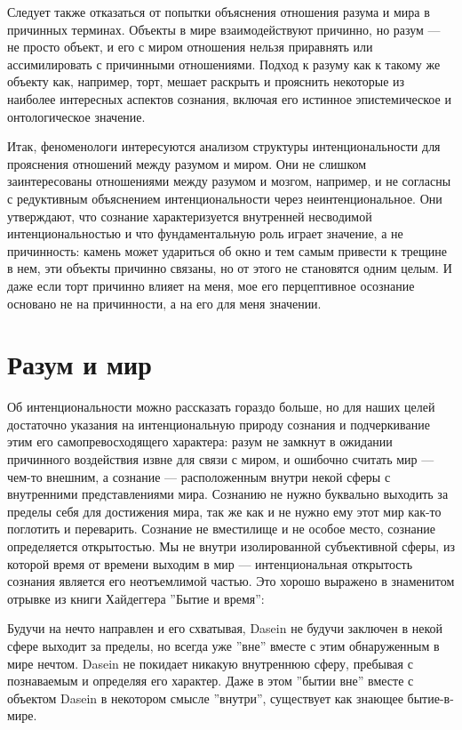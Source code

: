 \documentclass[11pt]{book}
\begin{document}
Следует также отказаться от попытки объяснения отношения разума и мира в причинных терминах. Объекты в мире взаимодействуют причинно, но разум --- не просто объект, и его с миром отношения нельзя приравнять или ассимилировать с причинными отношениями. Подход к разуму как к такому же объекту как, например, торт, мешает раскрыть и прояснить некоторые из наиболее интересных аспектов сознания, включая его истинное эпистемическое и онтологическое значение.

Итак, феноменологи интересуются анализом структуры интенциональности для прояснения отношений между разумом и миром. Они не слишком заинтересованы отношениями между разумом и мозгом, например, и не согласны с редуктивным объяснением интенциональности через неинтенциональное. Они утверждают, что сознание характеризуется внутренней несводимой интенциональностью и что фундаментальную роль играет значение, а не причинность: камень может удариться об окно и тем самым привести к трещине в нем, эти объекты причинно связаны, но от этого не становятся одним целым. И даже если торт причинно влияет на меня, мое его перцептивное осознание основано не на причинности, а на его для меня значении.

\section{Разум и мир}

Об интенциональности можно рассказать гораздо больше, но для наших целей достаточно указания на интенциональную природу сознания и подчеркивание этим его самопревосходящего характера: разум не замкнут в ожидании причинного воздействия извне для связи с миром, и ошибочно считать мир --- чем-то внешним, а сознание --- расположенным внутри некой сферы с внутренними представлениями мира. Сознанию не нужно буквально выходить за пределы себя для достижения мира, так же как и не нужно ему этот мир как-то поглотить и переварить. Сознание не вместилище и не особое место, сознание определяется открытостью. Мы не внутри изолированной субъективной сферы, из которой время от времени выходим в мир --- интенциональная открытость сознания является его неотъемлимой частью. Это хорошо выражено в знаменитом отрывке из книги Хайдеггера ''Бытие и время'':

\smallskip
{}\relax
{}\relax

Будучи на нечто направлен и его схватывая, Dasein не будучи заключен в некой сфере выходит за пределы, но всегда уже ''вне'' вместе с этим обнаруженным в мире нечтом. Dasein не покидает никакую внутреннюю сферу, пребывая с познаваемым и определяя его характер. Даже в этом ''бытии вне'' вместе с объектом Dasein в некотором смысле ''внутри'', существует как знающее бытие-в-мире.
\end{document}
